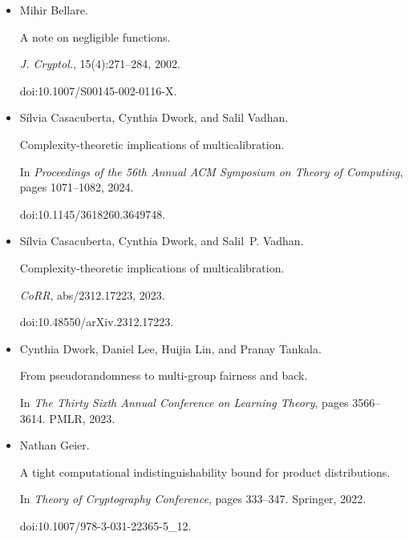 \begin{itemize}


\item[] 
[1]

Mihir Bellare.


A note on negligible functions.


\emph{J. Cryptol.}, 15(4):271–284, 2002.


doi:10.1007/S00145-002-0116-X.





\item[] 
[2]

Sílvia Casacuberta, Cynthia Dwork, and Salil Vadhan.


Complexity-theoretic implications of multicalibration.


In \emph{Proceedings of the 56th Annual ACM Symposium on Theory of
Computing}, pages 1071–1082, 2024.


doi:10.1145/3618260.3649748.





\item[] 
[3]

Sílvia Casacuberta, Cynthia Dwork, and Salil P. Vadhan.


Complexity-theoretic implications of multicalibration.


\emph{CoRR}, abs/2312.17223, 2023.


doi:10.48550/arXiv.2312.17223.





\item[] 
[4]

Cynthia Dwork, Daniel Lee, Huijia Lin, and Pranay Tankala.


From pseudorandomness to multi-group fairness and back.


In \emph{The Thirty Sixth Annual Conference on Learning Theory}, pages
3566–3614. PMLR, 2023.





\item[] 
[5]

Nathan Geier.


A tight computational indistinguishability bound for product
distributions.


In \emph{Theory of Cryptography Conference}, pages 333–347. Springer,
2022.


doi:10.1007/978-3-031-22365-5\_12.






\end{itemize}
